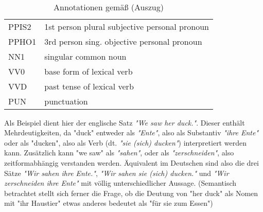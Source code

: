 \documentclass[12pt]{report}
\begin{document}
\begin{table}[h]
\tt
\begin{tabular}{ll}
PPIS2	& 1st person plural subjective personal pronoun \\
PPHO1	& 3rd person sing. objective personal pronoun\\
NN1		& singular common noun \\
VV0		& base form of lexical verb \\
VVD		& past tense of lexical verb \\
PUN		& punctuation
\end{tabular}
\caption{Annotationen gemäß \cite{clw7} (Auszug)}
\end{table} 

\rm

Als Beispiel dient hier der englische Satz \textit{"We saw her duck."}. Dieser enthält Mehrdeutigkeiten, da "duck" entweder als \textit{"Ente"}, also als Substantiv \textit{"ihre Ente"} oder als "ducken", also als Verb (dt. \textit{"sie (sich) ducken"}) interpretiert werden kann. Zusätzlich kann "we saw" als \textit{"sahen"}, oder als \textit{"zerschneiden"}, also zeitformabhängig verstanden werden. Äquivalent im Deutschen sind also die drei Sätze \textit{"Wir sahen ihre Ente."}, \textit{"Wir sahen sie (sich) ducken."} und \textit{"Wir zerschneiden ihre Ente"} mit völlig unterschiedlicher Aussage. (Semantisch betrachtet stellt sich ferner die Frage, ob die Deutung von "her duck" als Nomen mit "ihr Haustier" etwas anderes bedeutet als "für sie zum Essen")
\end{document}
